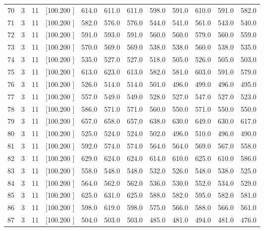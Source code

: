 \documentclass[12pt,a4paper]{article}
\begin{document}
\begin{center}
{\begin{tabular}{r r r r r r r r r r r r}
  70&  3& 11&[100.200   ]&   614.0&   611.0&   611.0&   598.0&   591.0&   610.0&   591.0&   582.0\\[-0.02in]
  71&  3& 11&[100.200   ]&   582.0&   576.0&   576.0&   544.0&   541.0&   561.0&   543.0&   540.0\\[-0.02in]
  72&  3& 11&[100.200   ]&   591.0&   593.0&   591.0&   560.0&   560.0&   579.0&   560.0&   559.0\\[-0.02in]
  73&  3& 11&[100.200   ]&   570.0&   569.0&   569.0&   538.0&   538.0&   560.0&   538.0&   535.0\\[-0.02in]
  74&  3& 11&[100.200   ]&   535.0&   527.0&   527.0&   518.0&   505.0&   526.0&   505.0&   503.0\\[-0.02in]
  75&  3& 11&[100.200   ]&   613.0&   623.0&   613.0&   582.0&   581.0&   603.0&   591.0&   579.0\\[-0.02in]
  76&  3& 11&[100.200   ]&   526.0&   514.0&   514.0&   501.0&   496.0&   499.0&   496.0&   495.0\\[-0.02in]
  77&  3& 11&[100.200   ]&   557.0&   549.0&   549.0&   528.0&   527.0&   547.0&   527.0&   523.0\\[-0.02in]
  78&  3& 11&[100.200   ]&   586.0&   571.0&   571.0&   560.0&   550.0&   571.0&   550.0&   550.0\\[-0.02in]
  79&  3& 11&[100.200   ]&   657.0&   658.0&   657.0&   638.0&   630.0&   649.0&   630.0&   617.0\\[-0.02in]
  80&  3& 11&[100.200   ]&   525.0&   524.0&   524.0&   502.0&   496.0&   510.0&   496.0&   490.0\\[-0.02in]
  81&  3& 11&[100.200   ]&   592.0&   574.0&   574.0&   564.0&   564.0&   569.0&   567.0&   558.0\\[-0.02in]
  82&  3& 11&[100.200   ]&   629.0&   624.0&   624.0&   614.0&   610.0&   625.0&   610.0&   586.0\\[-0.02in]
  83&  3& 11&[100.200   ]&   558.0&   548.0&   548.0&   532.0&   526.0&   548.0&   538.0&   525.0\\[-0.02in]
  84&  3& 11&[100.200   ]&   564.0&   562.0&   562.0&   536.0&   530.0&   552.0&   534.0&   529.0\\[-0.02in]
  85&  3& 11&[100.200   ]&   625.0&   631.0&   625.0&   588.0&   582.0&   595.0&   582.0&   581.0\\[-0.02in]
  86&  3& 11&[100.200   ]&   598.0&   619.0&   598.0&   575.0&   566.0&   588.0&   566.0&   561.0\\[-0.02in]
  87&  3& 11&[100.200   ]&   504.0&   503.0&   503.0&   485.0&   481.0&   494.0&   481.0&   476.0\\[-0.02in]

\end{tabular}}
\end{center}
\end{document}

